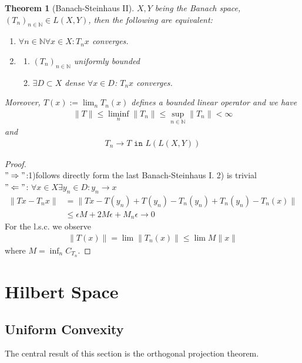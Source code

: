 \documentclass[a4paper,11pt,fleqn]{book}
\newtheorem{theorem}{Theorem}[section]
\theoremstyle{definition}
\theoremstyle{remark}
\begin{document}
\begin{theorem}[Banach-Steinhaus II]
	$X, Y$ being the Banach space, $(T_n)_{n \in \mathbb{N}} \in L(X, Y)$, then the following are equivalent:
	\begin{enumerate}
		\item $\forall n \in \mathbb{N} \forall x \in X: T_n x$ converges.
		\item 
		\begin{enumerate}
			\item $(T_n)_{n \in \mathbb{N}}$ uniformly bounded
			\item $\exists D \subset X$ dense $\forall x \in D$: $T_n x $ converges. 
		\end{enumerate}  
	\end{enumerate}
	Moreover, $T(x) := \lim_n T_n(x)$ defines a bounded linear operator and we have
	\begin{align*}
		\|T\| \le \liminf_n\|T_n\| \le \sup_{n \in \mathbb{N}}\|T_n\| < \infty
	\end{align*}
	and 
	\begin{align*}
		T_n \rightarrow T  \texttt{ in } L(L(X, Y))
	\end{align*}
\end{theorem}
\begin{proof}\quad\\
$"\Rightarrow"$:1)follows directly form the last Banach-Steinhaus I. 2) is trivial \\
$"\Leftarrow"$: $\forall x \in X \exists y_n \in D:y_n \rightarrow x$
\begin{align*}
	\|Tx - T_n x\| &= \|Tx - T(y_n) + T(y_n) - T_n(y_n) + T_n(y_n) - T_n(x)\|\\
	&\le \epsilon M  + 2M \epsilon + M_n \epsilon \rightarrow 0
\end{align*}
For the l.s.c. we observe
\begin{align*}
	\|T(x)\| = \lim\|T_n(x)\| \le \lim M \|x\|
\end{align*}
where $M = \inf_n C_{T_n}$. 
\end{proof}






\newpage
\section{Hilbert Space}
\subsection{Uniform Convexity}
The central result of this section is the orthogonal projection theorem.
\end{document}
